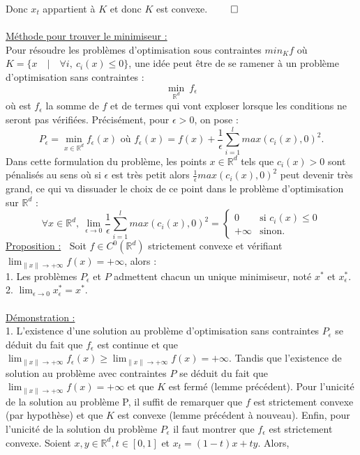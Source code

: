 \documentclass[12pt]{article}
\newcommand{\Rd}{\mathbb{R}^d}
\newcommand{\prop}{\underline{Proposition :} }
\newcommand{\demo}{\underline{Démonstration :} }
\begin{document}
Donc $x_t$ appartient à $K$ et donc $K$ est convexe. $\qed$\\
\\
\underline{Méthode pour trouver le minimiseur :}\\
Pour résoudre les problèmes d'optimisation sous contraintes $min_K f$ où $K = \{x \quad | \quad \forall i, \: c_i(x) \leq 0\}$, une idée peut être de se ramener à un problème d'optimisation sans contraintes : 
\[
\min_{\Rd} \: f_\epsilon\] 
où est $f_\epsilon$ la somme de $f$ et de termes qui vont exploser lorsque les conditions ne seront pas vérifiées. Précisément, pour $\epsilon > 0$, on pose :
\[
P_\epsilon = \min_{x\in\Rd} f_\epsilon(x) \text{ où } f_\epsilon(x) = f(x) + \frac{1}{\epsilon} \sum^{l}_{i = 1}max(c_i(x),0)^2.
\]
Dans cette formulation du problème, les points $x \in \Rd$ tels que $c_i(x) > 0$ sont pénalisés au sens où si $\epsilon$ est très petit alors $\frac{1}{\epsilon}max(c_i(x),0)^2$ peut devenir très grand, ce qui va dissuader le choix de ce point dans le problème d'optimisation sur $\Rd$ :
\[
\forall x \in \Rd, \: \lim_{\epsilon \to 0}\frac{1}{\epsilon} \sum^{l}_{i = 1}max(c_i(x),0)^2 = \left\{
    \begin{array}{ll}
        0 & \mbox{si } c_i(x) \leq 0 \\
        +\infty & \mbox{sinon.}
    \end{array}
\right.
\]
\prop $\:$ Soit $f \in C^0(\Rd)$ strictement convexe et vérifiant $\lim_{\lVert x\lVert \to +\infty} f(x) = +\infty$, alors :\\
1. Les problèmes $P_\epsilon$ et $P$ admettent chacun un unique minimiseur, noté $x^*$ et $x^*_\epsilon$.\\
2. $\lim_{\epsilon\to 0} x^*_\epsilon = x^*.$\\
\\
\demo $\:$\\
1. L'existence d'une solution au problème d'optimisation sans contraintes $P_\epsilon$ se déduit du fait que $f_\epsilon$ est continue et que $\lim_{\lVert x\lVert \to +\infty} f_{\epsilon}(x) \geq \lim_{\lVert x\lVert \to +\infty} f(x) = +\infty$. Tandis que l'existence de solution au problème avec contraintes $P$ se déduit du fait que $\lim_{\lVert x\lVert \to +\infty} f(x) = +\infty$ et que $K$ est fermé (lemme précédent). Pour l'unicité de la solution au problème P, il suffit de remarquer que $f$ est strictement convexe (par hypothèse) et que $K$ est convexe (lemme précédent à nouveau). Enfin, pour l'unicité de la solution du problème $P_\epsilon$ il faut montrer que $f_\epsilon$ est strictement convexe. Soient $x,y \in \Rd, t \in [0,1]$ et $x_t = (1-t)x + ty$. Alors,
\end{document}
